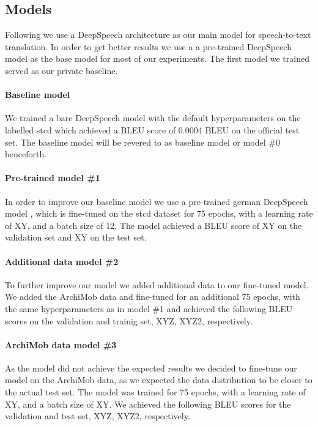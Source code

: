 \subsection{Models}
Following  we use a DeepSpeech architecture \cite{Hannun2014DeepSS} as our main model for speech-to-text translation. In order to get better results we use a
a pre-trained DeepSpeech model \cite{DeepSpeechGerman090} as the base model for most of our experiments. The first model we trained served as our private baseline. \paragraph{Baseline model} We trained a bare DeepSpeech model with the default hyperparameters
on the labelled \gls{stcd} which achieved a BLEU score of 0.0004 BLEU on the official test set. The baseline model will be revered to as baseline model or model \#0 henceforth.\paragraph{Pre-trained model \#1} In order to improve our baseline model we use a pre-trained
german DeepSpeech model \cite{DeepSpeechGerman090}, which is fine-tuned on the \gls{stcd} dataset for 75 epochs, with a learning rate of XY, and a batch size of 12. The model achieved a BLEU score of
XY on the validation set and XY on the test set.
\paragraph{Additional data model \#2} To further improve our  model we added additional data to our fine-tuned model. We added the ArchiMob data and fine-tuned for an additional 75 epochs, with
the same hyperparameters as in model \#1 and achieved the following BLEU scores on the validation and trainig set, XYZ, XYZ2, respectively.
\paragraph{ArchiMob data model \#3} As the  model did not achieve the expected results we decided to fine-tune our model on the ArchiMob data, as we expected the data distribution to be closer
to the actual test set. The model was trained for 75 epochs, with a learning rate of XY, and a batch size of XY. We achieved the following BLEU scores for the validation and test set, XYZ, XYZ2,
respectively.
